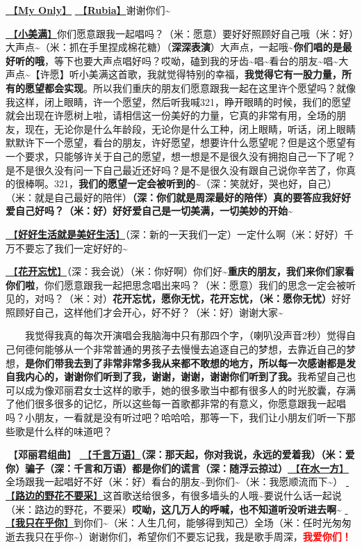 \documentclass[]{ctexbook}
\begin{document}
\hyperref[my-only]{🎵【\textbf{My Only}】} \hyperref[rubia]{🎵【\textbf{Rubia}】}谢谢你们\textasciitilde{}

\hyperref[happy-ending]{🎵【\textbf{小美满}】}你们愿意跟我一起唱吗？（米：愿意）要好好照顾好自己哦（米：好）大声点\textasciitilde（米：抓在手里捏成棉花糖）（\textbf{深深表演}）大声点，一起哦\textasciitilde{}\textbf{你们唱的是最好听的哦}，等下也要大声点唱好吗？哎呦，磕到我的牙齿\textasciitilde 唱\textasciitilde 看台的朋友\textasciitilde 唱\textasciitilde 大声点\textasciitilde【许愿】听小美满这首歌，我就觉得特别的幸福，\textbf{我觉得它有一股力量，所有的愿望都会实现}。所以我们重庆的朋友们愿意跟我一起在这里许个愿望吗？就像我这样，闭上眼睛，许一个愿望，然后听我喊321，睁开眼睛的时候，我们的愿望就会出现在许愿树上啦，请相信这一份美好的力量，它真的非常有用，全场的朋友，现在，无论你是什么年龄段，无论你是什么工种，闭上眼睛，听话，闭上眼睛默默许下一个愿望，看台的朋友，许好愿望，想要许什么愿望呢？但是这个愿望有一个要求，只能够许关于自己的愿望，想一想是不是很久没有拥抱自己一下了呢？是不是很久没有问一下自己最近还好吗？是不是很久没有跟自己说你辛苦了，你真的很棒啊。321，\textbf{我们的愿望一定会被听到的\textasciitilde{}}（深：笑就好，哭也好，自己）（米：就是自己最好的陪伴）\textbf{（深：你们就是周深最好的陪伴）真的要答应我好好爱自己好吗？（米：好）好好爱自己是一切美满，一切美妙的开始\textasciitilde{}}

\hyperref[live-happy-life-happy]{🎵【\textbf{好好生活就是美好生活}】}（深：新的一天我们一定）一定什么啊（米：好好）千万不要忘了我们一定好好的\textasciitilde{}

\hyperref[no-worries]{🎵【\textbf{花开忘忧}】}（深：我会说）（米：你好啊）你们好\textasciitilde{}\textbf{重庆的朋友，我们来你们家看你们啦}，你们愿意跟我一起把思念唱出来吗？（米：愿意）我们的思念一定会被听见的，对吗？（米：对）\textbf{花开忘忧，愿你无忧，花开忘忧，（米：愿你无忧）}好好照顾好自己，这样他们才会开心，好不好？（米：好）谢谢大家\textasciitilde{}

  我觉得我真的每次开演唱会我脑海中只有那四个字，（喇叭没声音2秒）觉得自己何德何能够从一个非常普通的男孩子去慢慢去追逐自己的梦想，去靠近自己的梦想，\textbf{是你们带我去到了非常非常多我从来都不敢想的地方，所以每一次感谢都是发自我内心的，谢谢你们听到了我，谢谢，谢谢，谢谢你们听到了我。}我希望自己也可以成为像邓丽君女士这样的歌手，她的很多歌当中都有很多人的时光胶囊，存满了他们很多很多的记忆，所以这些每一首歌都非常的有意义，你愿意跟我一起唱吗？小朋友，一看就是没有听过吧？哈哈哈，那等一下，我们让小朋友们听一下那些歌是什么样的味道吧？

🎵【\textbf{邓丽君组曲}】
\hyperref[thousands-of-words]{🎵【\textbf{千言万语}】}\textbf{（深：那天起，你对我说，永远的爱着我）（米：爱你）骗子（深：千言和万语）都是你们的谎言（深：随浮云掠过）}\hyperref[on-the-water-side]{🎵【\textbf{在水一方}】}全场跟我一起唱好不好（米：好）看台的朋友\textasciitilde 到你们\textasciitilde（米：我愿顺流而下\textasciitilde）
\hyperref[only-with-me]{🎵【\textbf{路边的野花不要采}】}这首歌送给很多，有很多墙头的人哦\textasciitilde 要说什么话一起说（米：路边的野花，不要采）\textbf{哎呦，这几万人的呼喊，也不知道听没听进去啊\textasciitilde{}}
\hyperref[only-you]{🎵【\textbf{我只在乎你}】}到你们\textasciitilde（米：人生几何，能够得到知己）全场（米：任时光匆匆逝去我只在乎你\textasciitilde）谢谢你们，希望你们不要忘记我，我是歌手周深，\textbf{\textcolor{red}{我爱你们！}}
\end{document}
